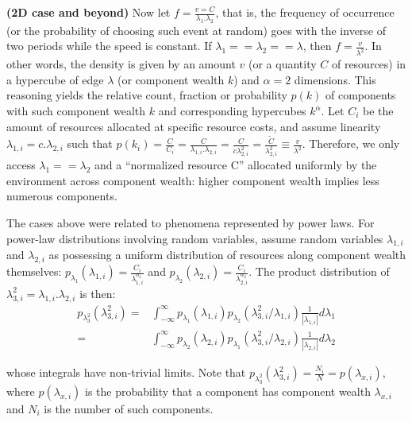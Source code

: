 \documentclass[10pt,letterpaper]{article}
\begin{document}
{\bf (2D case and beyond)} Now let $f=\frac{v=C}{\lambda_1 . \lambda_2}$, that is, the frequency of occurrence
(or the probability of choosing such event at random) goes with the inverse of two periods while the speed is constant. 
If $\lambda_1==\lambda_2==\lambda$, then $f=\frac{v}{\lambda^2}$.
In other words, the density is given by an amount $v$
(or a quantity $C$ of resources) in a hypercube of
edge $\lambda$ (or component wealth $k$)
and $\alpha=2$ dimensions.
This reasoning yields the relative count, fraction or probability $p(k)$ of components with such component wealth $k$ and corresponding hypercubes $k^\alpha$.
Let $C_i$ be the amount of resources allocated at
specific resource costs,
and assume linearity $\lambda_{1,i}=c.\lambda_{2,i}$
such that
$p(k_i)=\frac{C}{C_i}=\frac{C}{\lambda_{1,i}.\lambda_{2,i}}=
\frac{C}{c\lambda_{2,i}^2}=\frac{\widetilde{C}}{\lambda_{2,i}^2}\equiv\frac{v}{\lambda^2}$.
Therefore, we only access $\lambda_1==\lambda_2$ and a ``normalized resource C'' allocated uniformly by the environment across component wealth: higher component wealth implies less numerous components. 

The cases above were related to phenomena represented by power laws.
For power-law distributions involving random variables, assume
random variables
$\lambda_{1,i}$ and $\lambda_{2,i}$ as possessing a uniform distribution of resources along component wealth
themselves:
$p_{\lambda_{1}}(\lambda_{1,i})=\frac{C_i}{\lambda_{1,i}^{\alpha_1}}$
and
$p_{\lambda_{2}}(\lambda_{2,i})=\frac{C_i}{\lambda_{2,i}^{\alpha_2}}$.
The product distribution of
$\lambda_{3,i}^2=\lambda_{1,i}.\lambda_{2,i}$
is then:
\begin{align}
	p_{\lambda_3^2}(\lambda_{3,i}^2) = & \int_{-\infty}^{\infty} p_{\lambda_1}(\lambda_{1,i}) p_{\lambda_2}(\lambda_{3,i}^2/\lambda_{1,i})\frac{1}{|\lambda_{1,i}|}d\lambda_1 \\
	= & \int_{-\infty}^{\infty} p_{\lambda_2}(\lambda_{2,i}) p_{\lambda_1}(\lambda_{3,i}^2/\lambda_{2,i})\frac{1}{|\lambda_{2,i}|}d\lambda_2
\end{align}

\noindent whose integrals have non-trivial limits.
Note that $p_{\lambda_3^2}(\lambda_{3,i}^2)=\frac{N_i}{N}=p(\lambda_{x,i})$,
where $p(\lambda_{x,i})$ is the probability that a component has component wealth $\lambda_{x,i}$ and $N_i$ is the number of such components. 
\end{document}

